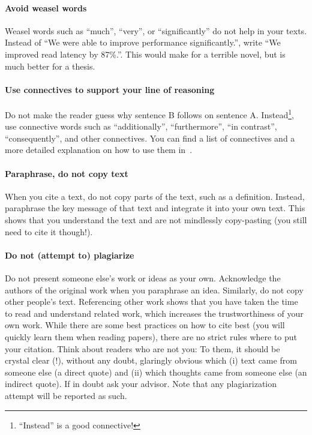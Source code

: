 \documentclass[a4paper]{article}
\begin{document}
\paragraph{Avoid weasel words}
Weasel words such as ``much'', ``very'', or ``significantly'' do not help in your texts.
Instead of ``We were able to improve performance significantly.'', write ``We improved read latency by 87\%.''.
This would make for a terrible novel, but is much better for a thesis.

\paragraph{Use connectives to support your line of reasoning}
Do not make the reader guess why sentence B follows on sentence A.
Instead\footnote{``Instead'' is a good connective!}, use connective words such as ``additionally'', ``furthermore'', ``in contrast'', ``consequently'', and other connectives.
You can find a list of connectives and a more detailed explanation on how to use them in~\cite{connectives}.

\paragraph{Paraphrase, do not copy text}
When you cite a text, do not copy parts of the text, such as a definition.
Instead, paraphrase the key message of that text and integrate it into your own text.
This shows that you understand the text and are not mindlessly copy-pasting (you still need to cite it though!).

\paragraph{Do not (attempt to) plagiarize}
\label{subsec:plags}
Do not present someone else's work or ideas as your own.
Acknowledge the authors of the original work when you paraphrase an idea.
Similarly, do not copy other people's text.
Referencing other work shows that you have taken the time to read and understand related work, which increases the trustworthiness of your own work.
While there are some best practices on how to cite best (you will quickly learn them when reading papers), there are no strict rules where to put your citation.
Think about readers who are not you: To them, it should be crystal clear (!), without any doubt, glaringly obvious which (i) text came from someone else (a direct quote) and (ii) which thoughts came from someone else (an indirect quote).
If in doubt ask your advisor.
Note that any plagiarization attempt will be reported as such.
\end{document}

